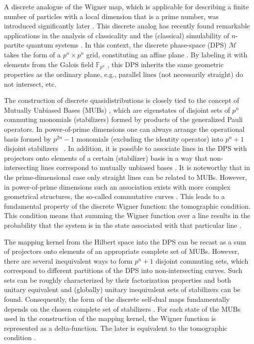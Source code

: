 \documentclass[quantumrep,article,submit,pdftex,moreauthors]{Definitions/mdpi}
\begin{document}
A discrete analogue of the Wigner map, which is applicable for describing a
finite number of particles with a local dimension that is a prime number,
was introduced significantly later \cite{spin1, spin2,wootters1,gibbons}.
This discrete analog has recently found remarkable applications in the
analysis of classicality and the (classical) simulability of $n$-partite
quantum systems \cite{gottKnill, galvao, cormick, gross,WignerNegResource,
Raus17, UniqueWF, cohomo}. In this context, the discrete phase-space (DPS)
$\mathcal{M}$ takes the form of a $p^{n}\times p^{n}$ grid, constituting an
affine plane \cite{Saniga2004}. By labeling it with elements from the Galois
field $\mathbb{F}_{p^{n}}$ , this DPS inherits the same geometric properties as
the ordinary plane, e.g., parallel lines (not necessarily straight) do not
intersect, etc.

The construction of discrete quasidistributions is closely tied to the
concept of Mutually Unbiased Bases (MUBs) \cite{ivanovic,mubs1,mubs2}, which
are eigenstates of disjoint sets of $p^{n}$ commuting monomials
(stabilizers) formed by products of the generalized Pauli operators. In
power-of-prime dimensions one can always arrange the operational basis formed by
$p^{2n}-1$ monomials (excluding the identity operator) into $p^{n}+1$ disjoint
stabilizers ~\cite{Bandyopadhyay2002}. In addition, it is possible to associate
lines in the DPS with projectors onto elements of a certain (stabilizer) basis
in a way that non-intersecting lines correspond to mutually unbiased bases
\cite{wootters1}. It is noteworthy that in the prime-dimensional case only
straight lines can be related to MUBs. However, in power-of-prime dimensions
such an association exists with more complex geometrical structures, the
so-called commutative curves \cite{GS2,JPA09}.  This leads to a fundamental
property of the discrete Wigner function: the tomographic condition. This
condition means that summing the Wigner function over a line results in the
probability that the system is in the state associated with that particular line
\cite{wootters1, gibbons}.

The mapping kernel from the Hilbert space into the DPS can be recast as a sum of
projectors onto elements of an appropriate complete set of MUBs. However, there
are several inequivalent ways to form $p^{n}+1$ disjoint commuting sets,
which correspond to different partitions of the DPS into non-intersecting
curves. Such sets can be roughly characterized by their factorization
properties and both unitary equivalent and (globally) unitary inequivalent
sets of stabilizers can be found. Consequently, the form of the discrete
self-dual maps fundamentally depends on the chosen complete set of
stabilizers \cite{Bjork2007}. For each state of the MUBs used in the
construction of the mapping kernel, the Wigner function is represented as a
delta-function. The later is equivalent to the tomographic condition
\cite{gibbons,galvao,cormick,DFW11,DFW12}.
\end{document}
